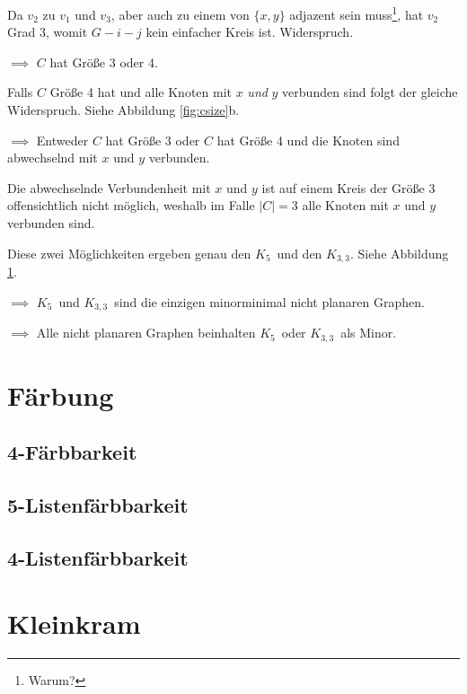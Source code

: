 \documentclass[10pt,a4paper]{article}
\makeatletter
\def\maxwidth#1{\ifdim\Gin@nat@width>#1 #1\else\Gin@nat@width\fi}
\newcommand{\imageFigureMultS}[7]{%
    \begin{figure}[h]%
        \centering
        \subfloat[#1]{{\texttt{[image: \#2]} }}%
        \qquad
        \subfloat[#3]{{\texttt{[image: \#4]} }}%
        \caption{#5}%
        \label{fig:#6}%
    \end{figure}
}
\newcommand{\Kf}{$K_5$}
\newcommand{\Kdd}{$K_{3,3}$}
\makeatother
\begin{document}
Da $v_2$ zu $v_1$ und $v_3$, aber auch zu einem von $\{x, y\}$ adjazent sein
muss\footnote{Warum?}, hat $v_2$ Grad 3, womit $G - i - j$ kein einfacher Kreis
ist. Widerspruch.

$\implies$ $C$ hat Größe 3 oder 4.

Falls $C$ Größe 4 hat und alle Knoten mit $x$ \textit{und} $y$ verbunden sind
folgt der gleiche Widerspruch.
Siehe Abbildung \ref{fig:csize}b.

$\implies$ Entweder $C$ hat Größe 3 oder $C$ hat Größe 4 und die Knoten sind
abwechselnd mit $x$ und $y$ verbunden.

Die abwechselnde Verbundenheit mit $x$ und $y$ ist auf einem Kreis der Größe 3
offensichtlich nicht möglich, weshalb im Falle $|C|=3$ alle Knoten mit $x$ und
$y$ verbunden sind.

Diese zwei Möglichkeiten ergeben genau den \Kf~und den \Kdd.
Siehe Abbildung \ref{fig:proof-k5}.

$\implies$ \Kf~und \Kdd~sind die einzigen minorminimal nicht planaren Graphen.

$\implies$ Alle nicht planaren Graphen beinhalten \Kf~oder \Kdd~als Minor.

\imageFigureMultS{\Kf}{proof-k5.png}{\Kdd}{proof-k33.png}{}{proof-k5}{.3}


\section{Färbung}
\subsection{4-Färbbarkeit}
\subsection{5-Listenfärbbarkeit}
\subsection{4-Listenfärbbarkeit}



\section{Kleinkram}
\end{document}
